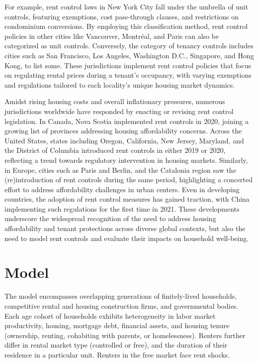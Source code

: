 \documentclass[parskip=full]{article}
\begin{document}
For example, rent control laws in New York City fall under the umbrella of unit controls, featuring exemptions, cost pass-through clauses, and restrictions on condominium conversions. By employing this classification method, rent control policies in other cities like Vancouver, Montréal, and Paris can also be categorized as unit controls. Conversely, the category of tenancy controls includes cities such as San Francisco, Los Angeles, Washington D.C., Singapore, and Hong Kong, to list some. These jurisdictions implement rent control policies that focus on regulating rental prices during a tenant's occupancy, with varying exemptions and regulations tailored to each locality's unique housing market dynamics.

Amidst rising housing costs and overall inflationary pressures, numerous jurisdictions worldwide have responded by enacting or revising rent control legislation. In Canada, Nova Scotia implemented rent controls in 2020, joining a growing list of provinces addressing housing affordability concerns. Across the United States, states including Oregon, California, New Jersey, Maryland, and the District of Columbia introduced rent controls in either 2019 or 2020, reflecting a trend towards regulatory intervention in housing markets. Similarly, in Europe, cities such as Paris and Berlin, and the Catalonia region saw the (re)introduction of rent controls during the same period, highlighting a concerted effort to address affordability challenges in urban centers. Even in developing countries, the adoption of rent control measures has gained traction, with China implementing such regulations for the first time in 2021. These developments underscore the widespread recognition of the need to address housing affordability and tenant protections across diverse global contexts, but also the need to model rent controls and evaluate their impacts on household well-being.

\section{Model}\label{sec:model}

The model encompasses overlapping generations of finitely-lived households, competitive rental and housing construction firms, and governmental bodies. Each age cohort of households exhibits heterogeneity in labor market productivity, housing, mortgage debt, financial assets, and housing tenure (ownership, renting, cohabiting with parents, or homelessness). Renters further differ in rental market type (controlled or free), and the duration of their residence in a particular unit. Renters in the free market face rent shocks.
\end{document}
